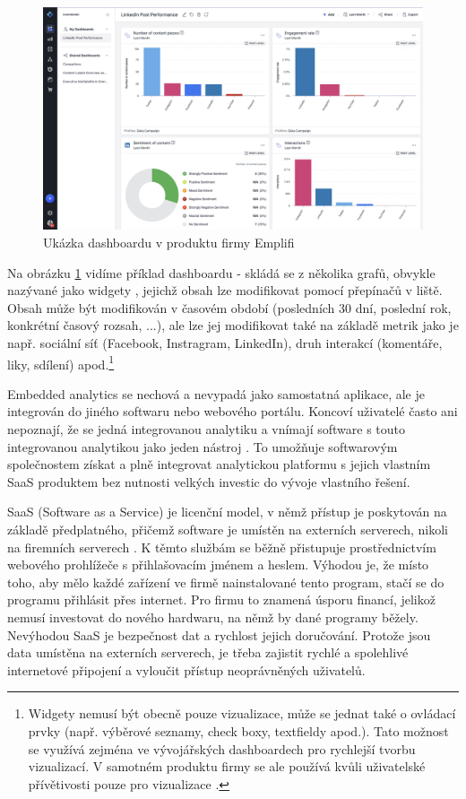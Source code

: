 \documentclass[czech, bc, kiv, he, iso690numb]{fasthesis}
\begin{document}
\begin{figure}
	\centering
	\includegraphics[width=1\textwidth]{pictures/emplifi-dashboard-example.png}
	\caption{Ukázka dashboardu v produktu firmy Emplifi \cite{emplifidashboardIMAGE}}
	\label{fig:emplifiDashUkazka}
\end{figure}

Na obrázku \ref{fig:emplifiDashUkazka} vidíme příklad dashboardu - skládá se z několika grafů, obvykle nazývané jako widgety \cite{emplifiDashboard}, jejichž obsah lze modifikovat pomocí přepínačů v liště. Obsah může být modifikován v časovém období (posledních 30 dní, poslední rok, konkrétní časový rozsah, ...), ale lze jej modifikovat také na základě metrik jako je např. sociální síť (Facebook, Instragram, LinkedIn), druh interakcí (komentáře, liky, sdílení) apod.\footnote{Widgety nemusí být obecně pouze vizualizace, může se jednat také o ovládací prvky (např. výběrové seznamy, check boxy, textfieldy apod.). Tato možnost se využívá zejména ve vývojářských dashboardech pro rychlejší tvorbu vizualizací. V samotném produktu firmy se ale používá kvůli uživatelské přívětivosti pouze pro vizualizace \cite{emplifiDashboard}. 
}

Embedded analytics se nechová a nevypadá jako samostatná aplikace, ale je integrován do jiného softwaru nebo webového portálu. Koncoví uživatelé často ani nepoznají, že se jedná
integrovanou analytiku a vnímají software s touto integrovanou analytikou jako jeden nástroj \cite{goodDataEmbedded}. To umožňuje softwarovým společnostem získat a plně
integrovat analytickou platformu s jejich vlastním SaaS produktem bez nutnosti velkých investic do vývoje vlastního řešení. 

SaaS (Software as a Service) je licenční model, v němž přístup je poskytován na základě předplatného, přičemž software je umístěn na externích serverech, nikoli na firemních serverech \cite{saasDefinition}.
K těmto službám se běžně přistupuje prostřednictvím webového prohlížeče s přihlašovacím jménem a heslem. Výhodou je, že místo toho, aby mělo každé zařízení ve firmě nainstalované
tento program, stačí se do programu přihlásit přes internet. Pro firmu to znamená úsporu financí, jelikož nemusí investovat do nového hardwaru, na němž by dané programy běžely. 
Nevýhodou SaaS je bezpečnost dat a rychlost jejich doručování. Protože jsou data umístěna na externích serverech, je třeba zajistit rychlé a spolehlivé internetové připojení a vyloučit
přístup neoprávněných uživatelů.
\end{document}
